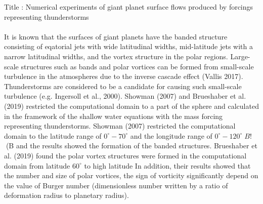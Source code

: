 \documentclass[a4j,12pt,openbib,oneside]{jreport}
\begin{document}
Title : Numerical experiments of giant planet surface flows 
produced by forcings representing thunderstorms
%
\\
\\
\quad 
It is known that the surfaces of giant planets have
the banded structure consisting of eqatorial jets with wide latitudinal widths,
mid-latitude jets with a narrow latitudinal widths, and 
the vortex structure in the polar regions.
%
Large-scale structures such as bands and polar vortices 
can be formed from small-scale turbulence in the atmospheres 
due to the inverse cascade effect (Vallis 2017). 
Thunderstorms are considered to be 
a candidate for causing such small-scale turbulence (e.g. Ingersoll et al., 2000).
%
Showman (2007) and Brueshaber et al. (2019) restricted the 
computational domain to a part of the sphere and 
calculated in the framework of the shallow water equations 
with the mass forcing representing thunderstorms.
%
%
Showman (2007) restricted the computational domain to the latitude range of 
$0^\circ - 70^\circ$ and the longitude range of $0^\circ - 120^\circ$$B!$(B
and the results showed the formation of the banded structures.
%
Brueshaber et al. (2019) found the polar vortex structures were formed 
in the computational domain from latitude $60^\circ$ to high latitude
%
In addition, their results showed 
that the number and size of polar vortices,
the sign of vorticity significantly depend on 
the value of Burger number (dimensionless number written 
by a ratio of deformation radius to planetary radius).
\end{document}
